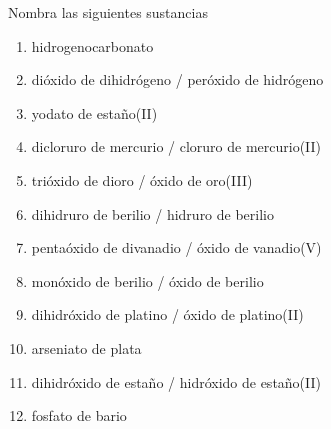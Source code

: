 \documentclass[10pt,a5paper,twoside]{article}
\begin{document}
\begin{exercise}[
    tags    = {inorgánica,nomenclatura,múltiple,2B},
    topics  = {química inorgánica,formulación,nomenclatura},
    source  = {Química 2B SAN 2016, p372, e9},
  ]
  Nombra las siguientes sustancias

  \begin{enumerate}\begin{multicols}{2}
    \item {}
    \item {}
    \item {}
    \item {}
    \item {}
    \item {}
    \item {}
    \item {}
    \item {}
    \item {}
    \item {}
    \item {}
  \end{multicols}\end{enumerate}
\end{exercise}

\begin{solution}
  \begin{enumerate}
    \item hidrogenocarbonato
    \item dióxido de dihidrógeno / peróxido de hidrógeno
    \item yodato de estaño(II)
    \item dicloruro de mercurio / cloruro de mercurio(II)
    \item trióxido de dioro / óxido de oro(III)
    \item dihidruro de berilio / hidruro de berilio
    \item pentaóxido de divanadio / óxido de vanadio(V)
    \item monóxido de berilio / óxido de berilio
    \item dihidróxido de platino / óxido de platino(II)
    \item arseniato de plata
    \item dihidróxido de estaño / hidróxido de estaño(II)
    \item fosfato de bario
  \end{enumerate}
\end{solution}
\end{document}
